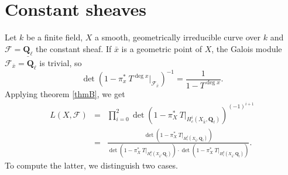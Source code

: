 \section{Constant sheaves} 

Let $k$ be a finite field, $X$ a smooth, geometrically irreducible curve over 
$k$ and $\mathcal{F} = \underline{\mathbf{Q}_\ell}$ the constant sheaf. If 
$\bar x$ is a geometric point of $X$, the Galois module $\mathcal{F}_{\bar x} = 
\mathbf{Q}_\ell$ is trivial, so  
$$
\det\left(1-\pi_x^*\ T^{\deg x}\Big|_{\mathcal{F}_{\bar x}}\right)^{-1} = 
\frac{1}{1-T^{\deg x}}.
$$
Applying theorem \ref{thmB}, we get
\begin{eqnarray*}
L(X, \mathcal{F}) & = & \prod_{i=0}^2 \det\left(1-\pi_X^*\ 
T\big|_{H_c^i(X_{\bar k}, \mathbf{Q}_\ell)}\right)^{(-1)^{i+1}} \\
& = & 
\frac{\det\left(1-\pi_X^*\ T\big|_{H_c^1(X_{\bar k}, 
\mathbf{Q}_\ell)}\right)}{\det\left(1-\pi_X^*\ T\big|_{H_c^0(X_{\bar k}, 
\mathbf{Q}_\ell)}\right)\cdot\det\left(1-\pi_X^*\ T\big|_{H_c^2(X_{\bar k}, 
\mathbf{Q}_\ell)}\right)}.
\end{eqnarray*}
To compute the latter, we distinguish two cases.
